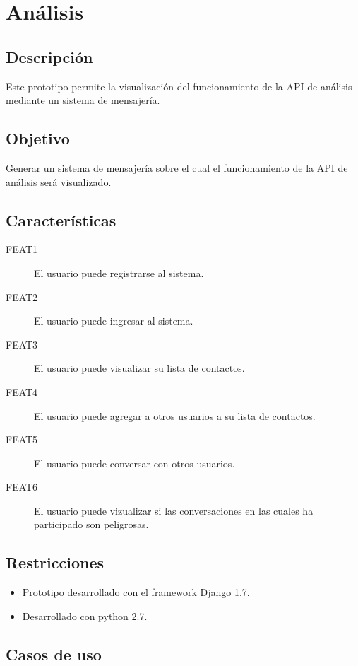 \section{An\'alisis}

\subsection{Descripci\'on}

Este prototipo permite la visualizaci\'on del funcionamiento de la API de an\'alisis mediante un sistema de mensajer\'ia.

\subsection{Objetivo}
Generar un sistema de mensajer\'ia sobre el cual el funcionamiento de la API de an\'alisis ser\'a visualizado. 

\subsection{Caracter\'isticas}

\begin{description}
\item[FEAT1] El usuario puede registrarse al sistema.
\item[FEAT2] El usuario puede ingresar al sistema.
\item[FEAT3] El usuario puede visualizar su lista de contactos.
\item[FEAT4] El usuario puede agregar a otros usuarios a su lista de contactos.
\item[FEAT5] El usuario puede conversar con otros usuarios.
\item[FEAT6] El usuario puede vizualizar si las conversaciones en las cuales ha participado son peligrosas.

\end{description}

\subsection{Restricciones}
\begin{itemize}
\item Prototipo desarrollado con el framework Django 1.7.
\item Desarrollado con python 2.7.
\end{itemize}

\subsection{Casos de uso}

